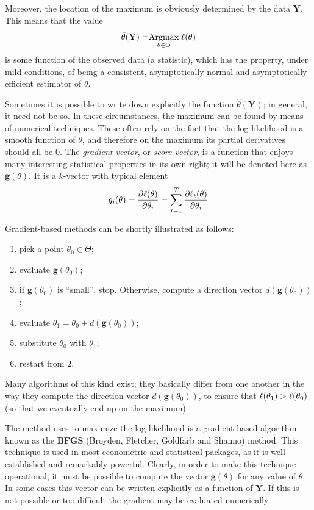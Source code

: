Moreover, the location of the maximum is obviously determined by the
data $\mathbf{Y}$. This means that the value
\begin{equation}
  \label{eq:maxlik}
  \hat{\theta}(\mathbf{Y}) = \mathrel{\mathop{\mathrm{Argmax}}\limits_{\theta \in \Theta}} \ell(\theta)
\end{equation}
is some function of the observed data (a statistic), which has the
property, under mild conditions, of being a consistent, asymptotically
normal and asymptotically efficient estimator of $\theta$.

Sometimes it is possible to write down explicitly the function
$\hat{\theta}(\mathbf{Y})$; in general, it need not be so. In these
circumstances, the maximum can be found by means of numerical
techniques. These often rely on the fact that the log-likelihood is a
smooth function of $\theta$, and therefore on the maximum its partial
derivatives should all be 0.  The \textsl{gradient vector}, or
\textsl{score vector}, is a function that enjoys many interesting
statistical properties in its own right; it will be denoted here as
$\mathbf{g}(\theta)$.  It is a $k$-vector with typical element
\[
g_i(\theta) = \frac{\partial\ell(\theta)}{\partial\theta_i} 
  = \sum_{t=1}^T \frac{\partial\ell_t(\theta)}{\partial\theta_i}
\]

Gradient-based methods can be shortly illustrated as follows:

\begin{enumerate}
\item pick a point $\theta_0 \in \Theta$;
\item evaluate $\mathbf{g}(\theta_0)$;
\item if $\mathbf{g}(\theta_0)$ is ``small'', stop. Otherwise, compute
  a direction vector $d(\mathbf{g}(\theta_0))$;
\item evaluate $\theta_1 = \theta_0 + d(\mathbf{g}(\theta_0))$;
\item substitute $\theta_0$ with $\theta_1$;
\item restart from 2.
\end{enumerate}

Many algorithms of this kind exist; they basically differ from one
another in the way they compute the direction vector
$d(\mathbf{g}(\theta_0))$, to ensure that $\ell(\theta_1) >
\ell(\theta_0)$ (so that we eventually end up on the maximum).

The method  uses to maximize the log-likelihood is a
gradient-based algorithm known as the \textbf{BFGS} (Broyden,
Fletcher, Goldfarb and Shanno) method. This technique is used in most
econometric and statistical packages, as it is well-established and
remarkably powerful. Clearly, in order to make this technique
operational, it must be possible to compute the vector
$\mathbf{g}(\theta)$ for any value of $\theta$. In some cases this
vector can be written explicitly as a function of $\mathbf{Y}$. If
this is not possible or too difficult the gradient may be evaluated
numerically.

